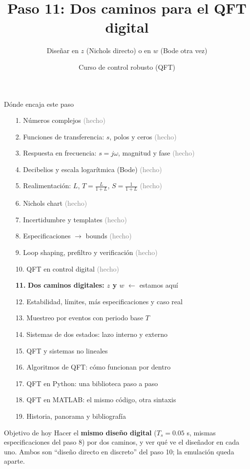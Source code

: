 \documentclass[aspectratio=169,11pt]{beamer}
\title[Dos caminos digitales]{Paso 11: Dos caminos para el QFT digital}
\subtitle{Diseñar en $z$ (Nichols directo) o en $w$ (Bode otra vez)}
\author{Curso de control robusto (QFT)}
\date{}
\begin{document}
\begin{frame}\titlepage\end{frame}

\begin{frame}{Dónde encaja este paso}
  \tiny
  \begin{enumerate}\setlength{\itemsep}{-2pt}
    \item[1.] Números complejos \hfill \textcolor{gray}{(hecho)}
    \item[2.] Funciones de transferencia: $s$, polos y ceros \hfill \textcolor{gray}{(hecho)}
    \item[3.] Respuesta en frecuencia: $s=j\omega$, magnitud y fase \hfill \textcolor{gray}{(hecho)}
    \item[4.] Decibelios y escala logarítmica (Bode) \hfill \textcolor{gray}{(hecho)}
    \item[5.] Realimentación: $L$, $T=\frac{L}{1+L}$, $S=\frac{1}{1+L}$ \hfill \textcolor{gray}{(hecho)}
    \item[6.] Nichols chart \hfill \textcolor{gray}{(hecho)}
    \item[7.] Incertidumbre y templates \hfill \textcolor{gray}{(hecho)}
    \item[8.] Especificaciones $\rightarrow$ bounds \hfill \textcolor{gray}{(hecho)}
    \item[9.] Loop shaping, prefiltro y verificación \hfill \textcolor{gray}{(hecho)}
    \item[10.] QFT en control digital \hfill \textcolor{gray}{(hecho)}
    \item[\textbf{11.}] \textbf{Dos caminos digitales: $z$ y $w$} \hfill $\leftarrow$ estamos aquí
    \item[12.] Estabilidad, límites, más especificaciones y caso real
    \item[13.] Muestreo por eventos con periodo base $T$
    \item[14.] Sistemas de dos estados: lazo interno y externo
    \item[15.] QFT y sistemas no lineales
    \item[16.] Algoritmos de QFT: cómo funcionan por dentro
    \item[17.] QFT en Python: una biblioteca paso a paso
    \item[18.] QFT en MATLAB: el mismo código, otra sintaxis
    \item[19.] Historia, panorama y bibliografía
  \end{enumerate}
  \vspace{2pt}
  \begin{block}{Objetivo de hoy}
    Hacer el \textbf{mismo diseño digital} ($T_s=0.05$ s, mismas especificaciones del paso 8) por dos caminos, y ver qué ve el diseñador en cada uno. Ambos son ``diseño directo en discreto'' del paso 10; la emulación queda aparte.
  \end{block}
\end{frame}
\end{document}

